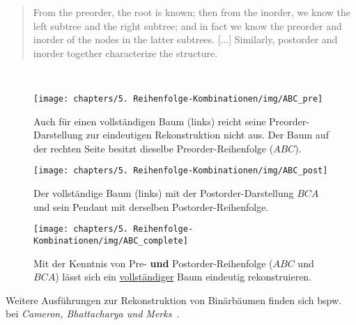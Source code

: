 \blockquote[{\cite[564, 7.]{Knu97}}]{
   From the preorder, the root is known; then from the inorder, we know the left subtree and the right subtree; and in fact we know the preorder and inorder of the nodes in the latter subtrees. [...] Similarly, postorder and inorder together characterize the structure.
}\\


\begin{figure}[h]
\centering
\texttt{[image: chapters/5. Reihenfolge-Kombinationen/img/ABC\_pre]}
\caption{Auch für einen vollständigen Baum (links) reicht seine Preorder-Darstellung zur eindeutigen Rekonstruktion nicht aus. Der Baum auf der rechten Seite besitzt dieselbe Preorder-Reihenfolge ($ABC$).}
\label{fig:ABC_pre}
\end{figure}

\begin{figure}[h]
\centering
\texttt{[image: chapters/5. Reihenfolge-Kombinationen/img/ABC\_post]}
\caption{Der vollständige Baum (links) mit der Postorder-Darstellung $BCA$ und sein Pendant mit derselben Postorder-Reihenfolge.}
\label{fig:ABC_post}
\end{figure}

\begin{figure}[h]
\centering
\texttt{[image: chapters/5. Reihenfolge-Kombinationen/img/ABC\_complete]}
\caption{Mit der Kenntnis von Pre- \textbf{und} Postorder-Reihenfolge ($ABC$ und $BCA$) lässt sich ein \underline{vollständiger} Baum eindeutig rekonstruieren.}
\label{fig:ABC_complete}
\end{figure}

Weitere Ausführungen zur Rekonstruktion von Binärbäumen finden sich bspw. bei \textit{Cameron, Bhattacharya und Merks}~\cite{CBM89}.
